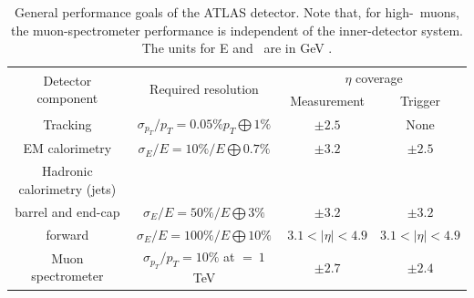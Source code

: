 \documentclass[letterpaper,12pt]{article}
\begin{document}
\begin{table}[thb]
	\centering
	\small
	\setlength\tabcolsep{5pt} 
	\begin{tabular}{|c|c|c|c| }
	\hline
	\multirow{2}{*}{Detector component}&\multirow{2}{*}{Required resolution} & \multicolumn{2}{c|}{$\eta$ coverage} \\ \cline{3-4}
	
	  & & Measurement &  Trigger\\ 
	 \hline
	Tracking         &    $\sigma_{p_T}/p_T = 0.05\%p_T\bigoplus 1\% $        &  $\pm 2.5$  & None \\  
	\hline
	EM calorimetry      &  $\sigma_E/E = 10\%/E\bigoplus 0.7\% $       & $\pm 3.2$ &  $\pm 2.5$\\
	\hline
	Hadronic calorimetry (jets)   &        & &      \\
	\hline
	barrel and end-cap &  $\sigma_E/E = 50\%/E\bigoplus 3\% $       & $\pm 3.2$ &  $\pm 3.2$\\
	forward   &  $\sigma_E/E = 100\%/E\bigoplus 10\% $       & $ 3.1 < |\eta | < 4.9 $ &  $3.1 < |\eta | < 4.9 $\\
	\hline
	Muon spectrometer  &    $\sigma_{p_T}/p_T = 10\%$ at \pt $=\ 1$ TeV        &  $\pm 2.7$  & $\pm 2.4$ \\  
	\hline
	\end{tabular}
	\vspace{0.2cm}
	\caption{General performance goals of the ATLAS detector. Note that, for high-\pt\ muons,
	the muon-spectrometer performance is independent of the inner-detector system. The units for E
	and \pt\ are in GeV \cite{PERF-2007-01}.}
	\label{tab:ATLAS_performance}
\end{table}
\end{document}
